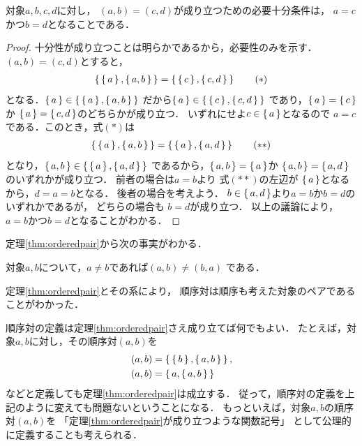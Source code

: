    \begin{thm}[順序対の特徴づけ] \label{thm:orderedpair}
     対象$a,  b,  c,  d$に対し，
     $(a,b)=(c,d)$が成り立つための必要十分条件は，
     $a=c$かつ$b=d$となることである．
   \end{thm}
   \begin{proof}
     十分性が成り立つことは明らかであるから，必要性のみを示す．
     $(a,b) = (c,d)$とすると，
     \begin{align}
       \set{\set{a},  \set{a,b}} = \set{\set{c} ,  \set{c,  d}}
       \tag{$\ast$}
     \end{align}
     となる．$\set{ a } \in \set{ \set{a}, \set{a,b} }$
     だから$\set{a} \in \set{ \set{c} , \set{c,d}}$
     であり，$\set{a} = \set{c} $か
     $\set{a} = \set{c,d}$のどちらかが成り立つ．
     いずれにせよ$c \in \set{a}$となるので
     $a=c$である．このとき，式$(\ast)$は
     \begin{align}
       \set{\set{a} , \set{a,b}} = \set{\set{a} , \set{a,d}}
       \tag{$\ast\ast$}
     \end{align}
     となり，$\set{a,b} \in \set{\set{a},\set{a,d}}$
     であるから，$\set{a,b} = \set{a}$か
     $\set{a,b} = \set{a,d}$のいずれかが成り立つ．
     前者の場合は$a=b$より
     式$(\ast\ast)$の左辺が
     $\set{a}$となるから，$d=a=b$となる．
     後者の場合を考えよう．
     $b \in \set{a,d}$より$a=b$か$b=d$の
     いずれかであるが，
     どちらの場合も
     $b=d$が成り立つ．
     以上の議論により，$a=b$かつ$b=d$となることがわかる．
   \end{proof}

   定理\ref{thm:orderedpair}から次の事実がわかる．
   \begin{coro}
     対象$a,  b$について，$a \neq b$であれば$(a,b) \neq (b,a)$
     である．
   \end{coro}
   定理\ref{thm:orderedpair}とその系により，
   順序対は順序も考えた対象のペアであることがわかった．
   
   順序対の定義は定理\ref{thm:orderedpair}さえ成り立てば何でもよい．
   たとえば，対象$a,  b$に対し，その順序対$(a,b)$を
   \begin{align*}
     (a,b) & = \set{ \set{b},  \set{a,  b}}, \\
     (a,b) & = \set{ a,  \set{a,b}}
   \end{align*}
   などと定義しても定理\ref{thm:orderedpair}は成立する．
   従って，順序対の定義を上記のように変えても問題ないということになる．
   もっといえば，対象$a,  b$の順序対$(a,b)$を
   「定理\ref{thm:orderedpair}が成り立つような関数記号」
   として公理的に定義することも考えられる．

